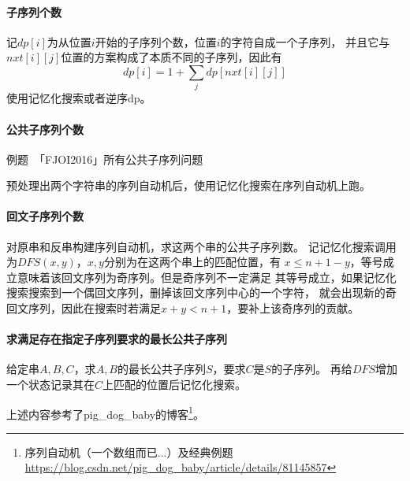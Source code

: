 \paragraph{子序列个数}
记$dp[i]$为从位置$i$开始的子序列个数，位置$i$的字符自成一个子序列，
并且它与$nxt[i][j]$位置的方案构成了本质不同的子序列，因此有
\begin{displaymath}
    dp[i]=1+\sum_j{dp[nxt[i][j]]}
\end{displaymath}
使用记忆化搜索或者逆序dp。
\paragraph{公共子序列个数}
例题~「FJOI2016」所有公共子序列问题

预处理出两个字符串的序列自动机后，使用记忆化搜索在序列自动机上跑。
\paragraph{回文子序列个数}
对原串和反串构建序列自动机，求这两个串的公共子序列数。
记记忆化搜索调用为$DFS(x,y)$，$x,y$分别为在这两个串上的匹配位置，有
$x\leq n+1-y$，等号成立意味着该回文序列为奇序列。但是奇序列不一定满足
其等号成立，如果记忆化搜索搜索到一个偶回文序列，删掉该回文序列中心的一个字符，
就会出现新的奇回文序列，因此在搜索时若满足$x+y<n+1$，要补上该奇序列的贡献。
\paragraph{求满足存在指定子序列要求的最长公共子序列}
给定串$A,B,C$，求$A,B$的最长公共子序列$S$，要求$C$是$S$的子序列。
再给$DFS$增加一个状态记录其在$C$上匹配的位置后记忆化搜索。

上述内容参考了pig\_dog\_baby的博客\footnote{
    序列自动机（一个数组而已...）及经典例题
    \url{https://blog.csdn.net/pig\_dog\_baby/article/details/81145857}
}。
